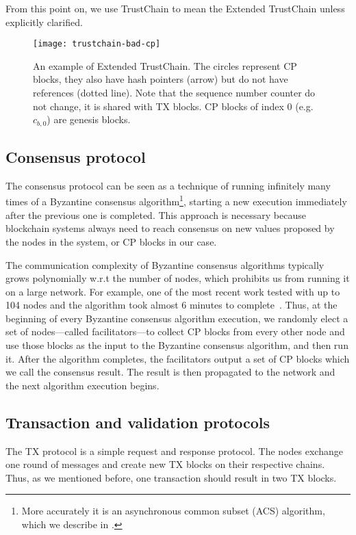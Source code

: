 From this point on, we use TrustChain to mean the Extended TrustChain unless explicitly clarified.

\begin{figure}
    \texttt{[image: trustchain-bad-cp]}
    \centering
    \caption{An example of Extended TrustChain.
    The circles represent CP blocks,
    they also have hash pointers (arrow) but do not have references (dotted line).
    Note that the sequence number counter do not change, it is shared with TX blocks.
    CP blocks of index 0 (e.g. $c_{b, 0}$) are genesis blocks.}
    \label{fig:trustchain-bad-cp}
\end{figure}

\subsection*{Consensus protocol}

The consensus protocol can be seen as a technique of running infinitely many times of a Byzantine consensus algorithm\footnote{More accurately it is an asynchronous common subset (ACS) algorithm, which we describe in .},
starting a new execution immediately after the previous one is completed.
This approach is necessary because blockchain systems always need to reach consensus on new values proposed by the nodes in the system,
or CP blocks in our case.

The communication complexity of Byzantine consensus algorithms typically grows polynomially w.r.t the number of nodes,
which prohibits us from running it on a large network.
For example, one of the most recent work tested with up to 104 nodes and the algorithm took almost 6 minutes to complete~\cite{miller2016honey}.
Thus, at the beginning of every Byzantine consensus algorithm execution,
we randomly elect a set of nodes---called facilitators---to collect CP blocks from every other node and use those blocks as the input to the Byzantine consensus algorithm, and then run it.
After the algorithm completes,
the facilitators output a set of CP blocks which we call the consensus result.
The result is then propagated to the network and the next algorithm execution begins.

\subsection*{Transaction and validation protocols}
The TX protocol is a simple request and response protocol.
The nodes exchange one round of messages and create new TX blocks on their respective chains.
Thus, as we mentioned before, one transaction should result in two TX blocks.

